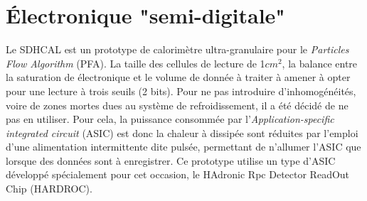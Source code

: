 \section{Électronique "semi-digitale"}
Le SDHCAL est un prototype de calorimètre ultra-granulaire pour le \textit{Particles Flow Algorithm} (PFA). La taille des cellules de lecture de 1$cm^2$, la balance entre la saturation de électronique et le volume de donnée à traiter à amener à opter pour une lecture à trois seuils (2 bits). Pour ne pas introduire d'inhomogénéités, voire de zones mortes dues au système de refroidissement, il a été décidé de ne pas en utiliser. Pour cela, la puissance consommée par l'\textit{Application-specific integrated circuit} (ASIC) est donc la chaleur à dissipée sont réduites par l'emploi d'une alimentation intermittente dite pulsée, permettant de n'allumer l'ASIC que lorsque des données sont à enregistrer. Ce prototype utilise un type d'ASIC développé spécialement pour cet occasion, le HAdronic Rpc Detector ReadOut Chip (HARDROC)\cite{Dulucq:2010ssa}.

